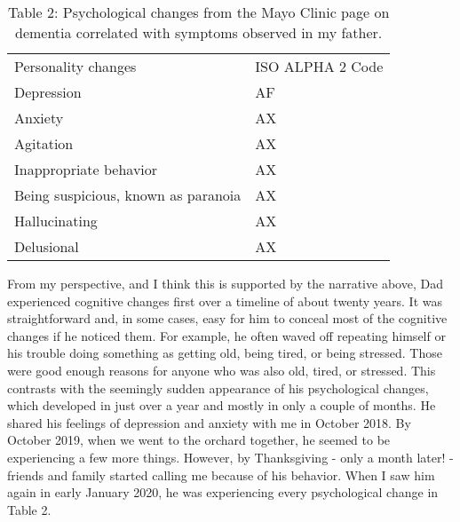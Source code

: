 \documentclass{article}
\begin{document}
\begin{table}[h!]
\centering
\begin{tabularx}{ 0.8\textwidth }{ | >{\raggedright\arraybackslash}X | >{\centering\arraybackslash}X | }
 \hline
 \multicolumn{2}{|c|}{Psychological Changes} \\
 \hline
 Personality changes& ISO ALPHA 2 Code\\
 \hline
 Depression   & AF   \\
 \hline
 Anxiety&   AX  \\
 \hline
 Agitation&   AX  \\
 \hline
 Inappropriate behavior&   AX  \\
 \hline
 Being suspicious, known as paranoia&   AX  \\
 \hline
 Hallucinating&   AX  \\
 \hline
 Delusional&   AX  \\
 \hline
\end{tabularx}
\caption{Table 2: Psychological changes from the Mayo Clinic page on dementia correlated with symptoms observed in my father.}
\end{table}

From my perspective, and I think this is supported by the narrative above, Dad experienced cognitive changes first over a timeline of about twenty years. It was straightforward and, in some cases, easy for him to conceal most of the cognitive changes if he noticed them. For example, he often waved off repeating himself or his trouble doing something as getting old, being tired, or being stressed. Those were good enough reasons for anyone who was also old, tired, or stressed. This contrasts with the seemingly sudden appearance of his psychological changes, which developed in just over a year and mostly in only a couple of months. He shared his feelings of depression and anxiety with me in October 2018. By October 2019, when we went to the orchard together, he seemed to be experiencing a few more things. However, by Thanksgiving - only a month later! - friends and family started calling me because of his behavior. When I saw him again in early January 2020, he was experiencing every psychological change in Table 2. 
\end{document}
